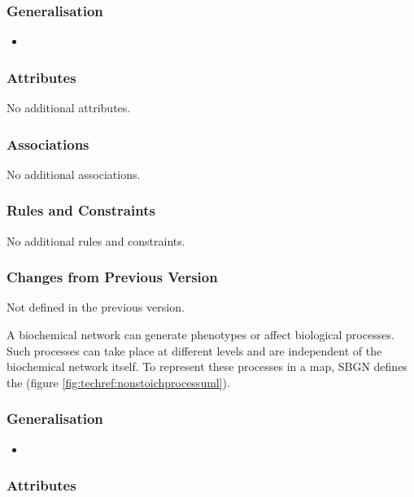 \subsubsection{Generalisation}

\begin{itemize}
\item {}
\end{itemize}

\subsubsection{Attributes}

No additional attributes.

\subsubsection{Associations}

No additional associations.

\subsubsection{Rules and Constraints}

No additional rules and constraints.

\subsubsection{Changes from Previous Version}

Not defined in the previous version.


A biochemical network can generate phenotypes or affect biological
processes.  Such processes can take place at different levels and are
independent of the biochemical network itself.  To represent these
processes in a map, SBGN defines the  (figure \ref{fig:techref:nonstoichprocessuml}).

\subsubsection{Generalisation}

\begin{itemize}
\item {}
\end{itemize}

\subsubsection{Attributes}

